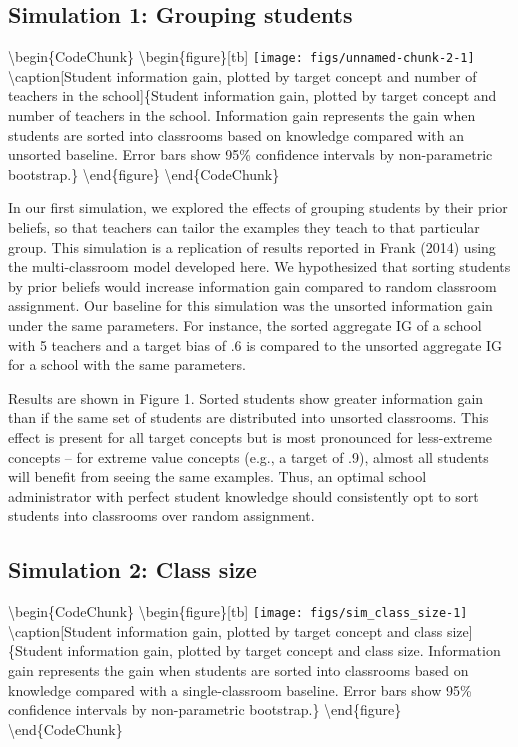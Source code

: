 \documentclass[10pt, letterpaper]{article}
\begin{document}
\subsection{Simulation 1: Grouping
students}\label{simulation-1-grouping-students}

\textbackslash{}begin\{CodeChunk\}
\textbackslash{}begin\{figure\}{[}tb{]}
\texttt{[image: figs/unnamed-chunk-2-1]}
\textbackslash{}caption{[}Student information gain, plotted by target
concept and number of teachers in the school{]}\{Student information
gain, plotted by target concept and number of teachers in the school.
Information gain represents the gain when students are sorted into
classrooms based on knowledge compared with an unsorted baseline. Error
bars show 95\% confidence intervals by non-parametric
bootstrap.\}\label{fig:unnamed-chunk-2} \textbackslash{}end\{figure\}
\textbackslash{}end\{CodeChunk\}

In our first simulation, we explored the effects of grouping students by
their prior beliefs, so that teachers can tailor the examples they teach
to that particular group. This simulation is a replication of results
reported in Frank (2014) using the multi-classroom model developed here.
We hypothesized that sorting students by prior beliefs would increase
information gain compared to random classroom assignment. Our baseline
for this simulation was the unsorted information gain under the same
parameters. For instance, the sorted aggregate IG of a school with 5
teachers and a target bias of .6 is compared to the unsorted aggregate
IG for a school with the same parameters.

Results are shown in Figure 1. Sorted students show greater information
gain than if the same set of students are distributed into unsorted
classrooms. This effect is present for all target concepts but is most
pronounced for less-extreme concepts -- for extreme value concepts
(e.g., a target of .9), almost all students will benefit from seeing the
same examples. Thus, an optimal school administrator with perfect
student knowledge should consistently opt to sort students into
classrooms over random assignment.

\subsection{Simulation 2: Class size}\label{simulation-2-class-size}

\textbackslash{}begin\{CodeChunk\}
\textbackslash{}begin\{figure\}{[}tb{]}
\texttt{[image: figs/sim\_class\_size-1]}
\textbackslash{}caption{[}Student information gain, plotted by target
concept and class size{]}\{Student information gain, plotted by target
concept and class size. Information gain represents the gain when
students are sorted into classrooms based on knowledge compared with a
single-classroom baseline. Error bars show 95\% confidence intervals by
non-parametric bootstrap.\}\label{fig:sim_class_size}
\textbackslash{}end\{figure\} \textbackslash{}end\{CodeChunk\}
\end{document}
